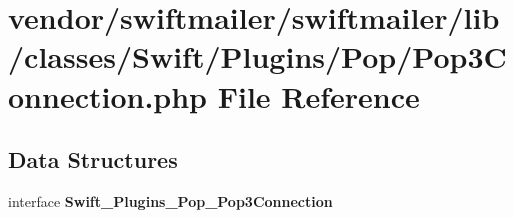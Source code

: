 \section{vendor/swiftmailer/swiftmailer/lib/classes/\+Swift/\+Plugins/\+Pop/\+Pop3\+Connection.php File Reference}
\label{_pop3_connection_8php}
\subsection*{Data Structures}
\begin{DoxyCompactItemize}
\item 
interface {\bf Swift\+\_\+\+Plugins\+\_\+\+Pop\+\_\+\+Pop3\+Connection}
\end{DoxyCompactItemize}
